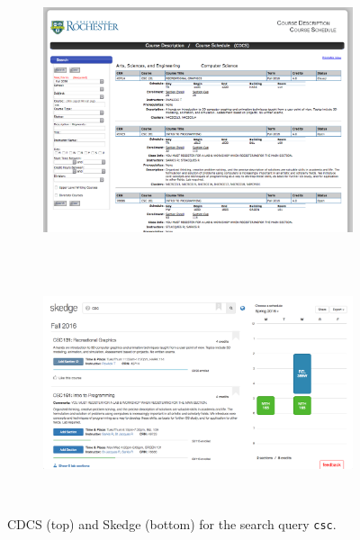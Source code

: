 \begin{figure}[ht]
    \centering
        \begin{subfigure}[h]{14mm}
            \centering
            \includegraphics[width=1.00\textwidth]{images/cdcs}
        \end{subfigure}\\
        \vspace{20pt}\\
        \begin{subfigure}[h]{15cm}
            \centering
            \includegraphics[width=1.00\textwidth]{images/skedge}
        \end{subfigure}
        \vspace{20pt}\\
    \caption{CDCS (top) and Skedge (bottom) for the search query {\tt csc}.}
\end{figure}

